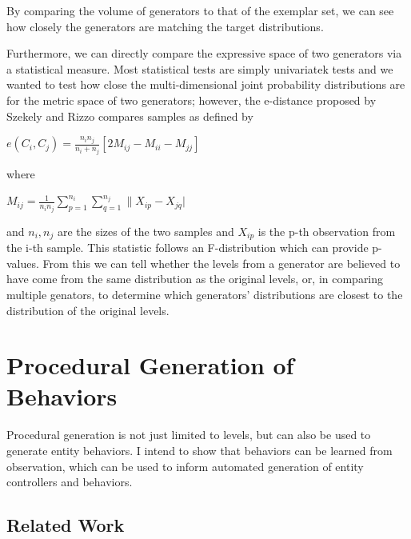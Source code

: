 \documentclass[12pt]{report}
\begin{document}
By comparing the volume of generators to that of the exemplar set, we can see how closely the generators are matching the target distributions.


Furthermore, we can directly compare the expressive space of two generators via a statistical measure.  Most statistical tests are simply univariatek tests and we wanted to test how close the multi-dimensional joint probability distributions are for the metric space of two generators; however, the e-distance proposed by Szekely and Rizzo \cite{szekely2013energy} compares samples as defined by

$e(C_i,C_j) = \frac{n_in_j}{n_i+n_j}[2M_{ij}-M_{ii}-M_{jj}]$

where

$M_{ij} = \frac{1}{n_in_j}\sum_{p=1}^{n_i}\sum_{q=1}^{n_j}\|X_{ip}-X_{jq}|$

and $n_i,n_j$ are the sizes of the two samples and $X_{ip}$ is the p-th observation from the i-th sample.   This statistic follows an F-distribution which can provide p-values.  From this we can tell whether the levels from a generator are believed to have come from the same distribution as the original levels, or, in comparing multiple genators, to determine which generators' distributions are closest to the distribution of the original levels.  








\chapter*{Procedural Generation of Behaviors}

Procedural generation is not just limited to levels, but can also be used to generate entity behaviors.  I intend to show that behaviors can be learned from observation, which can be used to inform automated generation of entity controllers and behaviors.


\section*{Related Work}
\end{document}

